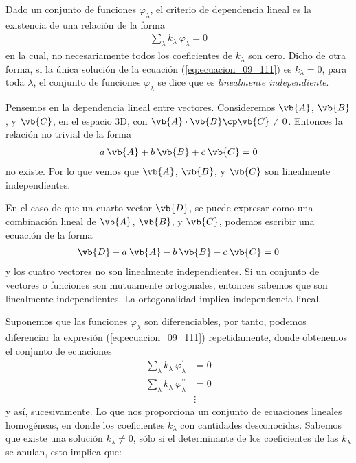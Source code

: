 Dado un conjunto de funciones $\varphi_{\lambda}$, el criterio de dependencia lineal es la existencia de una relación de la forma
\begin{align}
\sum_{\lambda} k_{\lambda} \: \varphi_{\lambda} = 0 
\label{eq:ecuacion_09_111}
\end{align}
en la cual, no necesariamente todos los coeficientes de $k_{\lambda}$ son cero. Dicho de otra forma, si la única solución de la ecuación (\ref{eq:ecuacion_09_111}) es $k_{\lambda} = 0$, para toda $\lambda$, el conjunto de funciones $\varphi_{\lambda}$ se dice que es \emph{linealmente independiente}.
\par
Pensemos en la dependencia lineal entre vectores. Consideremos $\vb{A}$, $\vb{B}$, y $\vb{C}$, en el espacio 3D, con $\vb{A} \cdot \vb{B} \cp \vb{C} \neq 0$. Entonces la relación no trivial de la forma
\begin{align}
a \: \vb{A} + b \: \vb{B} + c \: \vb{C} = 0
\label{eq:ecuacion_09_112}
\end{align}
no existe. Por lo que vemos que $\vb{A}$, $\vb{B}$, y $\vb{C}$ son linealmente independientes.
\par
En el caso de que un cuarto vector $\vb{D}$, se puede expresar como una combinación lineal de $\vb{A}$, $\vb{B}$, y $\vb{C}$, podemos escribir una ecuación de la forma
\begin{align}
\vb{D} -  a \: \vb{A} - b \: \vb{B} - c \: \vb{C} = 0
\label{eq:ecuacion_09_113}
\end{align}
y los cuatro vectores no son linealmente independientes. Si un conjunto de vectores o funciones son mutuamente ortogonales, entonces sabemos que son linealmente independientes. La ortogonalidad implica independencia lineal.
\par
Suponemos que las funciones $\varphi_{\lambda}$ son diferenciables, por tanto, podemos diferenciar la expresión (\ref{eq:ecuacion_09_111}) repetidamente, donde obtenemos el conjunto de ecuaciones
\begin{align}
\sum_{\lambda} k_{\lambda} \: \varphi^{\prime}_{\lambda} &= 0 \label{eq:ecuacion_09_114} \\[0.5em]
\sum_{\lambda} k_{\lambda} \: \varphi^{\prime \prime}_{\lambda} &= 0 \label{eq:ecuacion_09_115} \\[0.5em]
&\vdots \nonumber
\end{align}
y así, sucesivamente. Lo que nos proporciona un conjunto de ecuaciones lineales homogéneas, en donde los coeficientes $k_{\lambda}$ con cantidades desconocidas. Sabemos que existe una solución $k_{\lambda} \neq 0$, sólo si el determinante de los coeficientes de las $k_{\lambda}$ se anulan, esto implica que:

